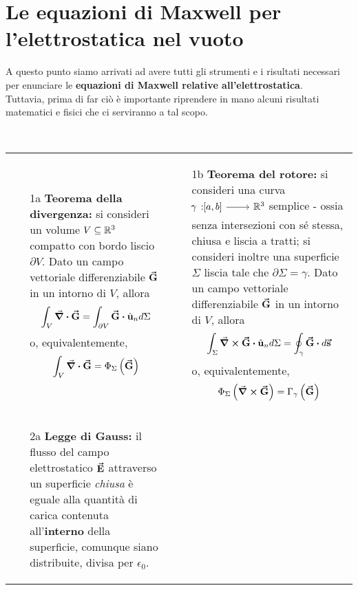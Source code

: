 \section{Le equazioni di Maxwell per l'elettrostatica nel vuoto}
A questo punto siamo arrivati ad avere tutti gli strumenti e i risultati necessari per enunciare le \textbf{equazioni di Maxwell relative all'elettrostatica}.\\
Tuttavia, prima di far ciò è importante riprendere in mano alcuni risultati matematici e fisici che ci serviranno a tal scopo.
\begin{remember}~\\
		\begin{tabular}{p{}p{}}
			\begin{itemize}
				\item[1a] \textbf{Teorema della divergenza:} si consideri un volume $V\subseteq\mathbb{R}^3$ compatto con bordo liscio $\partial V$. Dato un campo vettoriale differenziabile $\vb*{\va{G}}$ in un intorno di $V$, allora
				\begin{equation*}
					\int_V\div{\vba{G}}=\int_{\partial V}\vba{G}\vdot \vbh{u}_nd\Sigma
				\end{equation*}
				o, equivalentemente,
				\begin{equation*}
					\int_V\div{\vb*{\va{G}}}=\Phi_\Sigma\left(\vb*{\va{G}}\right)
				\end{equation*}
			\end{itemize} &
			\begin{itemize}
			\item[1b] \textbf{Teorema del rotore:} si consideri una curva $\funz[\gamma]{\left[a,b\right]}{\realset^3}$ semplice - ossia senza intersezioni con sé stessa, chiusa e liscia a tratti; si consideri inoltre una superficie $\Sigma$ liscia tale che $\partial \Sigma=\gamma$. Dato un campo vettoriale differenziabile $\vb*{\va{G}}$ in un intorno di $V$, allora
			\begin{equation*}
				\int_\Sigma\curl{\vba{G}}\vdot\vbh{u}_nd\Sigma=\oint_{\gamma}\vba{G}\vdot d\vba{s}
			\end{equation*}
			o, equivalentemente,
			\begin{equation*}
				\Phi_\Sigma\left(\curl{\vb*{\va{G}}}\right)=\Gamma_\gamma\left(\vb*{\va{G}}\right)
			\end{equation*}
		\end{itemize}\\
			\begin{itemize}
				\item[2a] \textbf{Legge di Gauss:} il flusso del campo elettrostatico $\vb*{\va{E}}$ attraverso un superficie \textit{chiusa} è eguale alla quantità di carica contenuta all'\textbf{interno} della superficie, comunque siano distribuite, divisa per $\epsilon_0$.

\end{itemize}
\end{tabular}
\end{remember}
